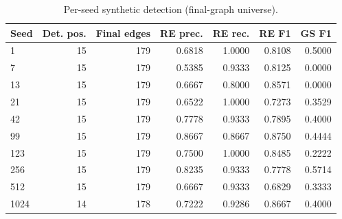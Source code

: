 \begin{table}[t]
\centering
\caption{Per-seed synthetic detection (final-graph universe).}
\label{tab:perseed}
{\small
\begin{tabular}{lrrrrrr}
\toprule
Seed & Det. pos. & Final edges & RE prec. & RE rec. & RE F1 & GS F1 \\
\midrule
1 & 15 & 179 & 0.6818 & 1.0000 & 0.8108 & 0.5000 \\
7 & 15 & 179 & 0.5385 & 0.9333 & 0.8125 & 0.0000 \\
13 & 15 & 179 & 0.6667 & 0.8000 & 0.8571 & 0.0000 \\
21 & 15 & 179 & 0.6522 & 1.0000 & 0.7273 & 0.3529 \\
42 & 15 & 179 & 0.7778 & 0.9333 & 0.7895 & 0.4000 \\
99 & 15 & 179 & 0.8667 & 0.8667 & 0.8750 & 0.4444 \\
123 & 15 & 179 & 0.7500 & 1.0000 & 0.8485 & 0.2222 \\
256 & 15 & 179 & 0.8235 & 0.9333 & 0.7778 & 0.5714 \\
512 & 15 & 179 & 0.6667 & 0.9333 & 0.6829 & 0.3333 \\
1024 & 14 & 178 & 0.7222 & 0.9286 & 0.8667 & 0.4000 \\
\bottomrule
\end{tabular}
}
\end{table}
